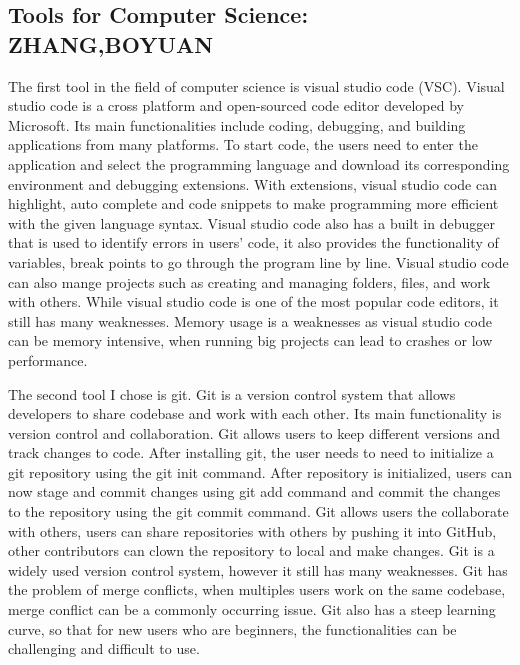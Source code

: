 \documentclass[a4paper, 11pt]{report}
\begin{document}
\subsection{Tools for Computer Science: ZHANG,BOYUAN}
The first tool in the field of computer science is visual studio code (VSC). Visual studio code is a cross platform and open-sourced code editor developed by Microsoft. Its main functionalities include coding, debugging, and building applications from many platforms\cite{Tabnine}.
To start code, the users need to enter the application and select the programming language and download its corresponding environment and debugging extensions. With extensions, visual studio code can highlight, auto complete and code snippets to make programming more efficient with the given language syntax. Visual studio code also has a built in debugger that is used to identify errors in users’ code, it also provides the functionality of variables, break points to go through the program line by line. Visual studio code can also mange projects such as creating and managing folders, files, and work with others.
While visual studio code is one of the most popular code editors, it still has many weaknesses. Memory usage is a weaknesses as visual studio code can be memory intensive, when running big projects can lead to crashes or low performance.

The second tool I chose is git. Git is a version control system that allows developers to share codebase and work with each other. Its main functionality is version control and collaboration. 
Git allows users to keep different versions and track changes to code. After installing git, the user needs to need to initialize a git repository using the git init command\cite{AT}. After repository is initialized, users can now stage and commit changes using git add command and commit the changes to the repository using the git commit command. Git allows users the collaborate with others, users can share repositories with others by pushing it into GitHub, other contributors can clown the repository to local and make changes.
Git is a widely used version control system, however it still has many weaknesses. Git has the problem of merge conflicts, when multiples users work on the same codebase, merge conflict can be a commonly occurring issue. Git also has a steep learning curve, so that for new users who are beginners, the functionalities can be challenging and difficult to use\cite{AT2}.

\end{document}
